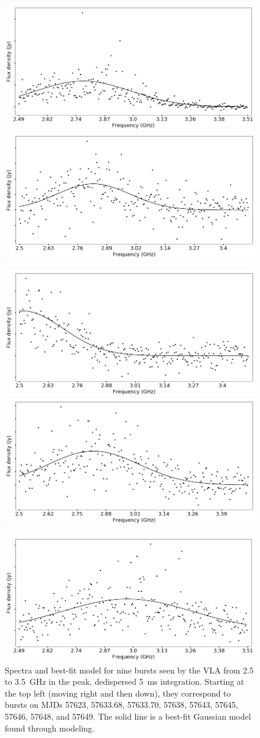 \documentclass[twocolumn]{aastex61}
\begin{document}
\begin{figure}[ht]
\begin{center}
 \begin{minipage}{2\columnwidth}
  \includegraphics[width=0.5\columnwidth]{spec_57643.png}
  \includegraphics[width=0.5\columnwidth]{spec_57645.png}
 \end{minipage}

 \begin{minipage}{2\columnwidth}
  \includegraphics[width=0.5\columnwidth]{spec_57646.png}
  \includegraphics[width=0.5\columnwidth]{spec_57648.png}
 \end{minipage}

 \begin{minipage}{2\columnwidth}
  \includegraphics[width=0.5\columnwidth]{spec_57649.png}
 \end{minipage}
\caption{Spectra and best-fit model for nine bursts seen by the VLA from 2.5 to 3.5~GHz in the peak, dedispersed 5~ms integration. Starting at the top left (moving right and then down), they correspond to bursts on MJDs 57623, 57633.68, 57633.70, 57638, 57643, 57645, 57646, 57648, and 57649. The solid line is a best-fit Gaussian model found through modeling.
\label{fig:spec}}
\end{center}
\end{figure}
\end{document}

